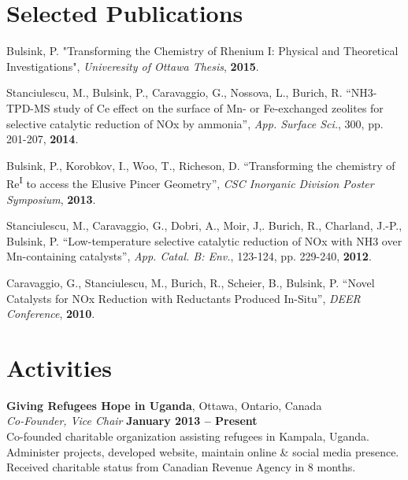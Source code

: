 \documentclass[margin,line]{resume}
\begin{document}
\begin{resume}
    \section{\mysidestyle Selected Publications}
    Bulsink, P. "Transforming the Chemistry of Rhenium I: Physical and Theoretical Investigations", \textit{Univeresity of Ottawa Thesis}, \textbf{2015}.

	Stanciulescu, M., Bulsink, P., Caravaggio, G., Nossova, L., Burich, R. ``NH3-TPD-MS study of Ce effect on the surface of Mn- or Fe-exchanged zeolites for selective catalytic reduction of NOx by ammonia'', \textit{App. Surface Sci.}, 300, pp. 201-207, \textbf{2014}.

	\vspace{0mm}
	Bulsink, P., Korobkov, I., Woo, T., Richeson, D. ``Transforming the chemistry of Re\textsuperscript{I} to access the Elusive Pincer Geometry'', \textit{CSC Inorganic Division Poster Symposium}, \textbf{2013}.

	\vspace{0mm}
Stanciulescu, M., Caravaggio, G., Dobri, A., Moir, J,. Burich, R., Charland, J.-P., Bulsink, P. ``Low-temperature selective catalytic reduction of NOx with NH3 over Mn-containing catalysts'', \textit{App. Catal. B: Env.}, 123-124, pp. 229-240, \textbf{2012}.

	\vspace{0mm}
Caravaggio, G., Stanciulescu, M., Burich, R., Scheier, B., Bulsink, P. ``Novel Catalysts for NOx Reduction with Reductants Produced In-Situ'', \textit{DEER Conference}, \textbf{2010}.
\vspace{1mm}

    \section{\mysidestyle Activities}

    \textbf{Giving Refugees Hope in Uganda}, Ottawa, Ontario, Canada\\\vspace{1mm}%
    \textsl{Co-Founder, Vice Chair} \hfill \textbf{January 2013 -- Present}\\
    Co-founded charitable organization assisting refugees in Kampala, Uganda. Administer projects, developed website, maintain online \& social media presence. Received charitable status from Canadian Revenue Agency in 8 months.


\end{resume}
\end{document}
